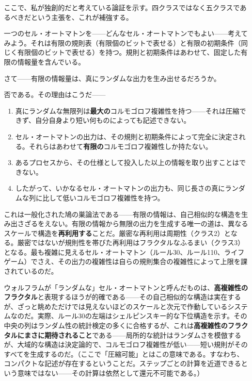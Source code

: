\documentclass[11pt, twoside, openright]{book}
\begin{document}
ここで、私が独創的だと考えている論証を示す。四クラスではなく五クラスであるべきだという主張を、これが補強する。

一つのセル・オートマトンを------どんなセル・オートマトンでもよい------考えてみよう。それは有限の規則表（有限個のビットで表せる）と有限の初期条件（同じく有限個のビットで表せる）を持つ。規則と初期条件はあわせて、固定した有限の情報量を含んでいる。

さて------有限の情報量は、真にランダムな出力を生み出せるだろうか。

否である。その理由はこうだ------

\begin{enumerate}
  \item 真にランダムな無限列は\textbf{最大の}コルモゴロフ複雑性を持つ------それは圧縮できず、自分自身より短い何ものによっても記述できない。
  \item セル・オートマトンの出力は、その規則と初期条件によって完全に決定される。それらはあわせて\textbf{有限の}コルモゴロフ複雑性しか持たない。
  \item あるプロセスから、その仕様として投入した以上の情報を取り出すことはできない。
  \item したがって、いかなるセル・オートマトンの出力も、同じ長さの真にランダムな列に比して低いコルモゴロフ複雑性を持つ。
\end{enumerate}

これは一般化された鳩の巣論法である------有限の情報は、自己相似的な構造を生み出さざるをえない。有限の情報から無限の出力を生成する唯一の道は、異なるスケールで構造を\textbf{再利用する}ことだ。厳密な再利用は周期性（クラス2）となる。厳密ではないが規則性を帯びた再利用はフラクタルなふるまい（クラス3）となる。最も複雑に見えるセル・オートマトン（ルール30、ルール110、ライフゲーム）でさえ、その出力の複雑性は自らの規則集合の複雑性によって上限を課されているのだ。

ウォルフラムが「ランダムな」セル・オートマトンと呼んだものは、\textbf{高複雑性のフラクタル}と表現するほうが的確である------その自己相似的な構造は実在するが、ざっと眺めただけでは見えないほどのスケールと次元で作動しているシステムなのだ。実際、ルール30の左端はシェルピンスキー的な下位構造を示す。その中央の列はランダム性の統計検定の多くに合格するが、これは\textbf{高複雑性のフラクタルにまさに期待されること}である------局所的な統計はランダムさを模倣するが、大域的な構造は決定論的で、コルモゴロフ複雑性が低い------短い規則がそのすべてを生成するのだ。（ここで「圧縮可能」とはこの意味である。すなわち、コンパクトな記述が存在するということだ。ステップごとの計算を近道できるという意味ではない------その計算は依然として還元不可能である。）
\end{document}
